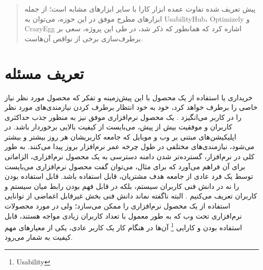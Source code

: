 \documentclass{report}
\theoremstyle{definition}
\begin{document}
\begin{abstract}
پیش تعریف شده تفاوت عمده ابزار کارا با سایر ابزارهای مشابه است؛ از جمله ابزارهای مطرح موفق در این حوزه، می‌توان به UsabilityHub، Optimizely و CrazyEgg اشاره کرد که همانطور که ذکر شد، در طی این پروژه، سعی بر برطرف‌سازی برخی از نواقص آن‌هاست.
	\end{abstract}
	\newpage
	\tableofcontents
	\newpage
	\chapter{تعریف مسئله}
خریداری یا استفاده از یک محصول با این پیش‌زمینه و تفکر که محصول مورد نظر نیاز خاصی را برطرف خواهد کرد، خود به خود انتظار برطرف کردن نیازمندی‌های مورد نظر را در کاربر می‌انگیزد
\cite{abdollahzade}.
یک محصول نرم‌افزاری موفق نیز به منظور جذب حداکثری کاربران و موفقیت بیش از پیش، می‌بایست از کیفیت بالایی برخوردار باشد. در اپلیکیشن‌های مبتنی بر وب و موبایل که جامعه کاربریشان هر روز بیشتر و بیشتر می‌شود، نیازمندی‌های مختلفی در طول چرخه عمر نرم‌افزار بروز پیدا می‌کنند. به طور کلی در نرم‌افزار،  گسترده‌تر شدن دامنه دسترسی به یک محصول نرم‌افزاری، الزاماتی برای آن فراهم می‌آورد که برای مثال، می‌توان گفت محصول نرم‌افزاری می‌بایست توسط یک فرد عادی از جامعه هدف مشتریان، قابل استفاده باشد. قابل استفاده بودن را نه در دانش فنی کاربران سیستم، بلکه در قابل فهم بودن رابط میان سیستم و کاربران تعریف می‌کنیم
\cite{measuring}.
البته ناگفته نماند دانش فنی بخش غیرقابل اغماضی از توانایی استفاده از یک محصول نرم‌افزاری را ممکن می‌سازد؛ ولی در مورد محصولات نرم‌افزاری تحت وب که به طور معمول با تعداد کاربران زیادی مواجه هستند، قابل استفاده بودن و کارایی 
\footnote{Usability}
آن‌ها در هنگام کار یک کاربر عادی، یکی از معیارهای مهم کیفیت به شمار می‌رود.
\end{document}

